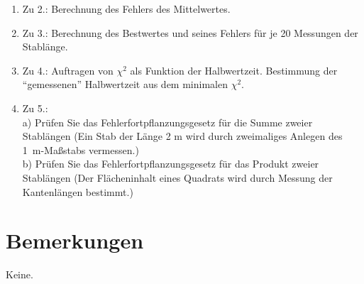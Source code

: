 \begin{enumerate}

\item Zu 2.: Berechnung des Fehlers des Mittelwertes.
\item Zu 3.: Berechnung des Bestwertes und seines Fehlers für
je 20 Messungen der Stablänge.
\item Zu 4.: Auftragen von $\chi^{2}$ als Funktion der
Halbwertzeit. Bestimmung der ``gemessenen'' Halbwertzeit aus dem
minimalen $\chi^{2}$.
\item Zu 5.:\\
a) Prüfen Sie das Fehlerfortpflanzungsgesetz für die Summe zweier
Stablängen (Ein Stab der Länge 2 m wird durch zweimaliges Anlegen des
1~m-Maßstabs vermessen.)\\ b) Prüfen Sie das Fehlerfortpflanzungsgesetz
für das Produkt zweier Stablängen (Der Flächeninhalt eines Quadrats
wird durch Messung der Kantenlängen bestimmt.)

\end{enumerate}



\section{Bemerkungen}


Keine.
